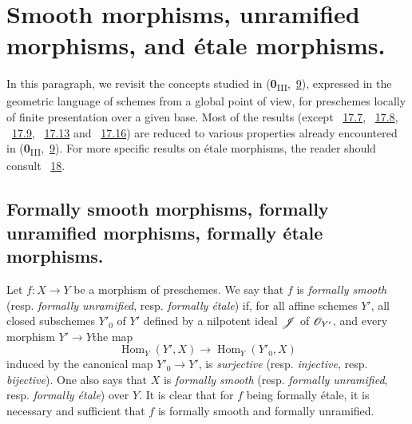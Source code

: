 \section{Smooth morphisms, unramified morphisms, and \'etale morphisms.}
\label{section:IV.17}

In this paragraph, we revisit the concepts studied in (\textbf{0}\textsubscript{III},~\hyperref[section:0.9]{9}), expressed in the geometric language of schemes from a global point of view, for preschemes locally of finite presentation over a given base.
Most of the results (except ~\hyperref[subsection:IV.17.7]{17.7}, ~\hyperref[subsection:IV.17.8]{17.8}, ~\hyperref[subsection:IV.17.9]{17.9}, ~\hyperref[subsection:IV.17.13]{17.13} and ~\hyperref[subsection:IV.17.16]{17.16}) are reduced to various properties already encountered in (\textbf{0}\textsubscript{III},~\hyperref[section:0.9]{9}).
For more specific results on \'etale morphisms, the reader should consult ~\textsection\hyperref[section:IV.18]{18}. 

\subsection{Formally smooth morphisms, formally unramified morphisms, formally \'etale morphisms.}
\label{subsection:IV.17.1}

\begin{definition}[17.1.1]
\label{IV.17.1.1}
Let $f:X\to Y$ be a morphism of preschemes. We say that $f$ is \emph{formally smooth} (resp. \emph{formally unramified}, resp. \emph{formally \'etale}) if, for all affine schemes $Y'$, all closed subschemes $Y'_{0}$ of $Y'$ defined by a nilpotent ideal $\mathscr{J}$ of $\mathscr{O}_{Y'}$, and every morphism $Y'\to Y$the map 
\[
\label{IV.17.1.1.1}
\operatorname{Hom}_{Y}(Y', X) \to \operatorname{Hom}_{Y}(Y'_{0}, X)
\tag{17.1.1.1}
\] induced by the canonical map $Y'_{0}\to Y'$, is \emph{surjective} (resp. \emph{injective}, resp. \emph{bijective}).
One also says that $X$ is \emph{formally smooth} (resp. \emph{formally unramified}, resp. \emph{formally \'etale}) over $Y$.
It is clear that for $f$ being formally \'etale, it is necessary and sufficient that $f$ is formally smooth and formally unramified.
\end{definition}

